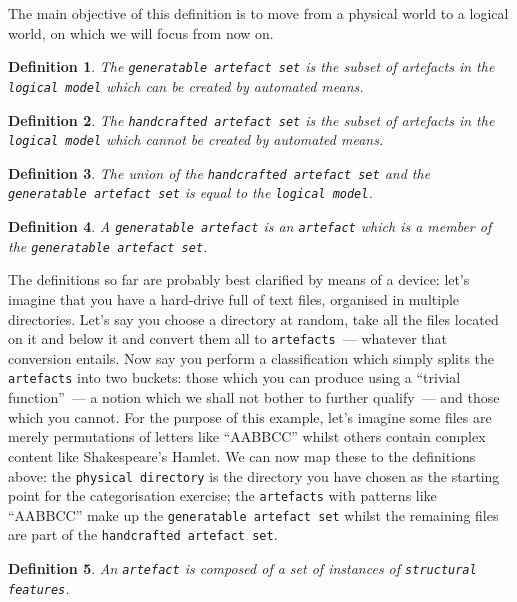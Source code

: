 \documentclass{book}
\newtheorem{concept}{Definition}
\begin{document}
The main objective of this definition is to move from a physical world
to a logical world, on which we will focus from now on.

\begin{concept}
  The \texttt{generatable artefact set} is the subset of artefacts in
  the \texttt{logical model} which can be created by automated means.
\end{concept}

\begin{concept}
  The \texttt{handcrafted artefact set} is the subset of artefacts in
  the \texttt{logical model} which cannot be created by automated
  means.
\end{concept}

\begin{concept}
  The union of the \texttt{handcrafted artefact set} and the
  \texttt{generatable artefact set} is equal to the \texttt{logical
    model}.
\end{concept}

\begin{concept}
  A \texttt{generatable artefact} is an \texttt{artefact} which is a
  member of the \texttt{generatable artefact set}.
\end{concept}

The definitions so far are probably best clarified by means of a
device: let's imagine that you have a hard-drive full of text files,
organised in multiple directories. Let's say you choose a directory at
random, take all the files located on it and below it and convert them
all to \texttt{artefacts}~--- whatever that conversion entails. Now
say you perform a classification which simply splits the
\texttt{artefacts} into two buckets: those which you can produce using
a ``trivial function''~--- a notion which we shall not bother to
further qualify~--- and those which you cannot. For the purpose of
this example, let's imagine some files are merely permutations of
letters like ``AABBCC'' whilst others contain complex content like
Shakespeare's Hamlet. We can now map these to the definitions above:
the \texttt{physical directory} is the directory you have chosen as
the starting point for the categorisation exercise; the
\texttt{artefacts} with patterns like ``AABBCC'' make up the
\texttt{generatable artefact set} whilst the remaining files are part
of the \texttt{handcrafted artefact set}.

\begin{concept}
An \texttt{artefact} is composed of a set of instances of
\texttt{structural features}.
\end{concept}
\end{document}
